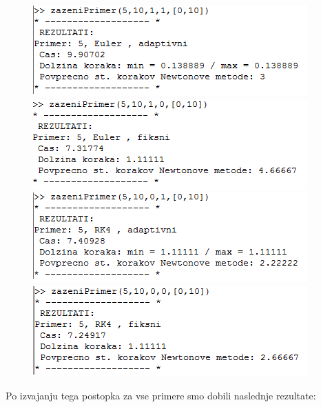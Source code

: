 \documentclass[12pt]{article}
\begin{document}
	\begin{figure}[H]
		\centering
		\begin{minipage}{.5\textwidth}
			\centering
			\includegraphics[scale=1]{a1}
			\includegraphics[scale=1]{a2}
			\includegraphics[scale=1]{a3}
			\includegraphics[scale=1]{a4}
		\end{minipage}%
	\end{figure}	
	\newpage
	Po izvajanju tega postopka za vse primere smo dobili naslednje rezultate: \\ \\
\end{document}
